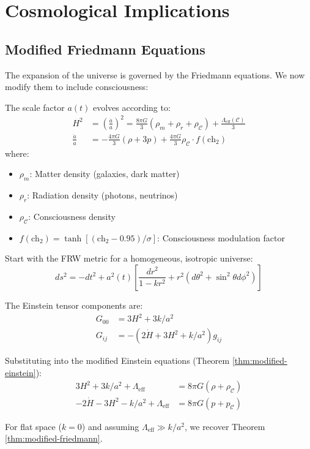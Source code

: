 \section{Cosmological Implications}

\subsection{Modified Friedmann Equations}

The expansion of the universe is governed by the Friedmann equations. We now modify them to include consciousness:

\begin{thm}\label{thm:modified-friedmann-field}
The scale factor $a(t)$ evolves according to:
\begin{align}
H^2 &= \left(\frac{\dot{a}}{a}\right)^2 = \frac{8\pi G}{3}(\rho_m + \rho_r + \rho_\mathcal{C}) + \frac{\Lambda_{\text{eff}}(\mathcal{C})}{3} \\
\frac{\ddot{a}}{a} &= -\frac{4\pi G}{3}(\rho + 3p) + \frac{4\pi G}{3} \rho_\mathcal{C} \cdot f(\text{ch}_2)
\end{align}
where:
\begin{itemize}
\item $\rho_m$: Matter density (galaxies, dark matter)
\item $\rho_r$: Radiation density (photons, neutrinos)
\item $\rho_\mathcal{C}$: Consciousness density
\item $f(\text{ch}_2) = \tanh[(\text{ch}_2 - 0.95)/\sigma]$: Consciousness modulation factor
\end{itemize}
\end{thm}

\begin{level2}
Start with the FRW metric\cite{robertson1935,walker1937,friedmann1922} for a homogeneous, isotropic universe:
\begin{equation}
ds^2 = -dt^2 + a^2(t) \left[ \frac{dr^2}{1-kr^2} + r^2(d\theta^2 + \sin^2\theta d\phi^2) \right]
\end{equation}

The Einstein tensor components are:
\begin{align}
G_{00} &= 3H^2 + 3k/a^2 \\
G_{ij} &= -(2\dot{H} + 3H^2 + k/a^2) g_{ij}
\end{align}

Substituting into the modified Einstein equations (Theorem \ref{thm:modified-einstein}):
\begin{align}
3H^2 + 3k/a^2 + \Lambda_{\text{eff}} &= 8\pi G (\rho + \rho_\mathcal{C}) \\
-2\dot{H} - 3H^2 - k/a^2 + \Lambda_{\text{eff}} &= 8\pi G (p + p_\mathcal{C})
\end{align}

For flat space ($k=0$) and assuming $\Lambda_{\text{eff}} \gg k/a^2$, we recover Theorem \ref{thm:modified-friedmann}.
\end{level2}

